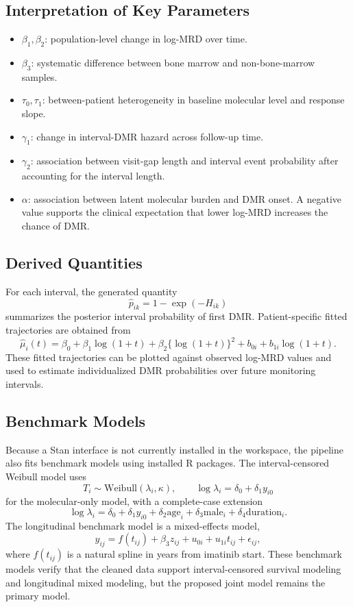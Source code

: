 \subsection{Interpretation of Key Parameters}

\begin{itemize}
  \item \(\beta_1,\beta_2\): population-level change in log-MRD over time.
  \item \(\beta_3\): systematic difference between bone marrow and non-bone-marrow samples.
  \item \(\tau_0,\tau_1\): between-patient heterogeneity in baseline molecular level and response slope.
  \item \(\gamma_1\): change in interval-DMR hazard across follow-up time.
  \item \(\gamma_2\): association between visit-gap length and interval event probability after accounting for the interval length.
  \item \(\alpha\): association between latent molecular burden and DMR onset. A negative value supports the clinical expectation that lower log-MRD increases the chance of DMR.
\end{itemize}

\subsection{Derived Quantities}

For each interval, the generated quantity
\[
\widehat{p}_{ik}=1-\exp(-H_{ik})
\]
summarizes the posterior interval probability of first DMR. Patient-specific fitted trajectories are obtained from
\[
\widehat{\mu}_{i}(t)
=\beta_0+\beta_1\log(1+t)+\beta_2\{\log(1+t)\}^2
+b_{0i}+b_{1i}\log(1+t).
\]
These fitted trajectories can be plotted against observed log-MRD values and used to estimate individualized DMR probabilities over future monitoring intervals.

\subsection{Benchmark Models}

Because a Stan interface is not currently installed in the workspace, the pipeline also fits benchmark models using installed R packages. The interval-censored Weibull model uses
\[
T_i \sim \mathrm{Weibull}(\lambda_i,\kappa),
\qquad
\log \lambda_i = \delta_0+\delta_1 y_{i0}
\]
for the molecular-only model, with a complete-case extension
\[
\log \lambda_i
=\delta_0+\delta_1y_{i0}+\delta_2\mathrm{age}_i
+\delta_3\mathrm{male}_i+\delta_4\mathrm{duration}_i.
\]
The longitudinal benchmark model is a mixed-effects model,
\[
y_{ij}
=f(t_{ij})+\beta_3z_{ij}+u_{0i}+u_{1i}t_{ij}+\epsilon_{ij},
\]
where \(f(t_{ij})\) is a natural spline in years from imatinib start. These benchmark models verify that the cleaned data support interval-censored survival modeling and longitudinal mixed modeling, but the proposed joint model remains the primary model.

